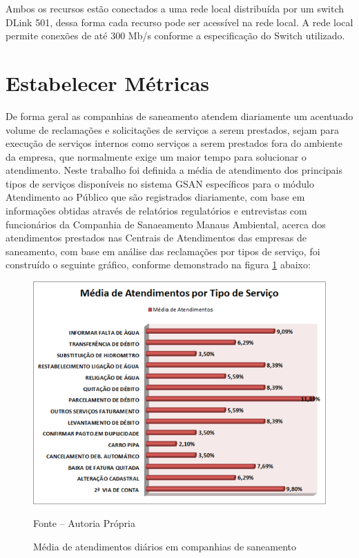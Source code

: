 Ambos os recursos estão conectados a uma rede local distribuída por um switch DLink 501, dessa forma cada recurso pode ser acessível na rede local. A rede local permite conexões de até 300 Mb/s conforme a especificação do Switch utilizado.


\section{Estabelecer Métricas}
De forma geral as companhias de saneamento atendem diariamente um acentuado volume de reclamações e solicitações de serviços a serem prestados, sejam para execução de serviços internos como serviços a serem prestados fora do ambiente da empresa, que normalmente exige um maior tempo para solucionar o atendimento.
Neste trabalho foi definida a média de atendimento dos principais tipos de serviços disponíveis no sistema GSAN específicos para o módulo Atendimento ao Público que são registrados diariamente, com base em informações obtidas através de relatórios regulatórios e entrevistas com funcionários da Companhia de Sanaeamento Manaus Ambiental, acerca dos atendimentos prestados nas Centrais de Atendimentos das empresas de saneamento, com base em análise das reclamações por tipos de serviço, foi construído o seguinte gráfico, conforme demonstrado na figura \ref{figura:mediaAtendimentos} abaixo:

\begin{figure}[!htb]
	\centering
	\includegraphics{figuras/media_atendimentos.png}
	\caption{Média de atendimentos diários em companhias de saneamento}	
	\label{figura:mediaAtendimentos}
	Fonte – Autoria Própria
\end{figure}


